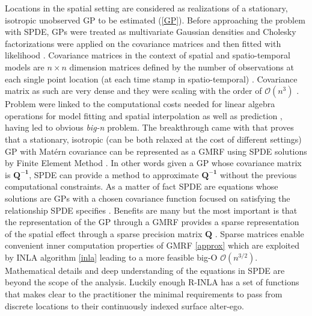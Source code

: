 \documentclass[
  12pt,
  a4paper,
  oneside]{book}
\theoremstyle{definition}
\theoremstyle{definition}
\theoremstyle{definition}
\theoremstyle{remark}
\begin{document}
Locations in the spatial setting are considered as realizations of a stationary, isotropic unobserved GP to be estimated (\ref{GP}). Before approaching the problem with SPDE, GPs were treated as multivariate Gaussian densities and Cholesky factorizations were applied on the covariance matrices and then fitted with likelihood \citep{LecturePaci}. Covariance matrices in the context of spatial and spatio-temporal models \citep{PACI2017149, Cameletti2012} are \(n \times n\) dimension matrices defined by the number of observations at each single point location (at each time stamp in spatio-temporal) \citep{BLANGIARDO201339}. Covariance matrix as such are very dense and they were scaling with the order of \(\mathcal{O}\left(n^{3}\right)\) \citep{Banerjee-Gelfand}. Problem were linked to the computational costs needed for linear algebra operations for model fitting and spatial interpolation as well as prediction \citep{Cameletti2012}, having led to obvious \emph{big-n} problem.
The breakthrough came with \citet{Lindgren2011} that proves that a stationary, isotropic (can be both relaxed at the cost of different settings) GP with Matérn covariance can be represented as a GMRF using SPDE solutions by Finite Element Method \citep{Krainski-Rubio}. In other words given a GP whose covariance matrix is \(\boldsymbol{Q^{-1}}\), SPDE can provide a method to approximate \(\boldsymbol{Q^{-1}}\) without the previous computational constraints. As a matter of fact SPDE are equations whose solutions are GPs with a chosen covariance function focused on satisfying the relationship SPDE specifies \citeyearpar{Krainski-Rubio}.
Benefits are many but the most important is that the representation of the GP through a GMRF provides a sparse representation of the spatial effect through a sparse precision matrix \(\boldsymbol{Q}\) . Sparse matrices enable convenient inner computation properties of GMRF \ref{approx} which are exploited by INLA algorithm \ref{inla} leading to a more feasible big-O \(\mathcal{O}\left(n^{3 / 2}\right)\). Mathematical details and deep understanding of the equations in SPDE are beyond the scope of the analysis. Luckily enough R-INLA has a set of functions that makes clear to the practitioner the minimal requirements to pass from discrete locations to their continuously indexed surface alter-ego.
\end{document}
